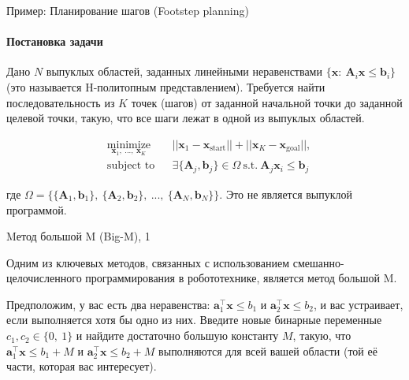 \documentclass{beamer}
\begin{document}
	
	
	
	\begin{frame}{Пример: Планирование шагов (Footstep planning)}
		\framesubtitle{Постановка задачи}
		\begin{flushleft}
			
			Дано $N$ выпуклых областей, заданных линейными неравенствами $\{ \mathbf{x}: \  \mathbf{A}_i \mathbf{x} \leq \mathbf{b}_i \}$ (это называется H-политопным представлением). Требуется найти последовательность из $K$ точек (шагов) от заданной начальной точки до заданной целевой точки, такую, что все шаги лежат в одной из выпуклых областей.
			
			\begin{equation}
				\begin{aligned}
					& \underset{\mathbf{x}_1, \ ..., \ \mathbf{x}_K}{\text{minimize}}
					& & ||\mathbf{x}_1 - \mathbf{x}_{\text{start}}|| + ||\mathbf{x}_K - \mathbf{x}_{\text{goal}}||, \\
					& \text{subject to}
					& & \exists \{ \mathbf{A}_j, \mathbf{b}_j\} \in \Omega \ \text{s.t.} \ \mathbf{A}_j\mathbf{x}_i \leq \mathbf{b}_j
				\end{aligned}
			\end{equation}
			
			\bigskip
			
			где $\Omega = \{ \{ \mathbf{A}_1, \mathbf{b}_1\}, \ \{ \mathbf{A}_2, \mathbf{b}_2\}, \ ..., \ \{ \mathbf{A}_N, \mathbf{b}_N\} \}$. Это не является выпуклой программой.
			
		\end{flushleft}
	\end{frame}
	
	
	
	
	
	\begin{frame}{Mетод большой M (Big-M), 1}
		\begin{flushleft}
			
			
			Одним из ключевых методов, связанных с использованием смешанно-целочисленного программирования в робототехнике, является метод большой M. 
			
			\bigskip
			
			Предположим, у вас есть два неравенства: $\mathbf{a}_1^\top \mathbf{x} \leq b_1$ и $\mathbf{a}_2^\top \mathbf{x} \leq b_2$, и вас устраивает, если выполняется хотя бы одно из них. Введите новые бинарные переменные $c_1, c_2 \in \{0, \ 1 \}$ и найдите достаточно большую константу $M$, такую, что $\mathbf{a}_1^\top \mathbf{x} \leq b_1 + M$ и $\mathbf{a}_2^\top \mathbf{x} \leq b_2 + M$ выполняются для всей вашей области (той её части, которая вас интересует).
			
			
			
			\begin{figure} [h!]
				\begin{center}
					
				\end{center} 
			\end{figure}
			
		\end{flushleft}
	\end{frame}
	
\end{document}
